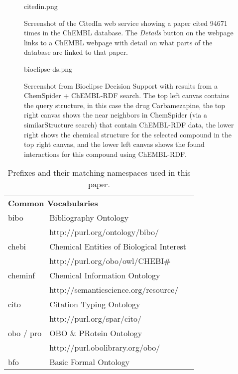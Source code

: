 \documentclass[10pt]{bmc_article}
\newenvironment{bmcformat}{\begin{raggedright}\baselineskip20pt\sloppy\setboolean{publ}{false}}{\end{raggedright}\baselineskip20pt\sloppy}
\begin{document}
\begin{bmcformat}
\begin{figure*}[!ht]
		\begin{center}
		citedin.png
		\caption[wee]{Screenshot of the CitedIn web service showing a paper cited 94671 times in the ChEMBL database.
		   The \textit{Details} button on the webpage links to a ChEMBL webpage with detail on what parts of the database are
		   linked to that paper.}
	\label{fig:citedin}
		\end{center}
\end{figure*}

\begin{figure*}[!ht]
		\begin{center}
		bioclipse-ds.png
		\caption[wee]{Screenshot from Bioclipse Decision Support with results from a ChemSpider + ChEMBL-RDF search. The top left canvas contains the query structure, in this case the drug Carbamezapine, the top right canvas shows the near neighbors in ChemSpider (via a similarStructure search) that contain ChEMBL-RDF data, the lower right shows the chemical structure for the selected compound in the top right canvas, and the lower left canvas shows the found interactions for this compound using ChEMBL-RDF.}
	\label{fig:bioclipse-ds}
		\end{center}
\end{figure*}

\newpage

\begin{table*}
\caption{Prefixes and their matching namespaces used in this paper.} \label{namespaces}
\begin{center}
\begin{tabular}{ll}
\hline
\multicolumn{2}{l}{\textbf{Common Vocabularies}} \\
bibo    & Bibliography Ontology~\cite{Giasson2011} \\
        & http://purl.org/ontology/bibo/ \\
chebi   & Chemical Entities of Biological Interest~\cite{DeMatos2010} \\
        & http://purl.org/obo/owl/CHEBI\# \\
cheminf & Chemical Information Ontology~\cite{Hastings2011} \\
        & http://semanticscience.org/resource/ \\
cito    & Citation Typing Ontology~\cite{Shotton2010} \\
        & http://purl.org/spar/cito/ \\
obo / pro & OBO \& PRotein Ontology~\cite{Sidhu2006} \\
          & http://purl.obolibrary.org/obo/ \\
bfo     & Basic Formal Ontology~\cite{Smith2004} \\


\end{tabular}
\end{center}
\end{table*}
\end{bmcformat}
\end{document}
